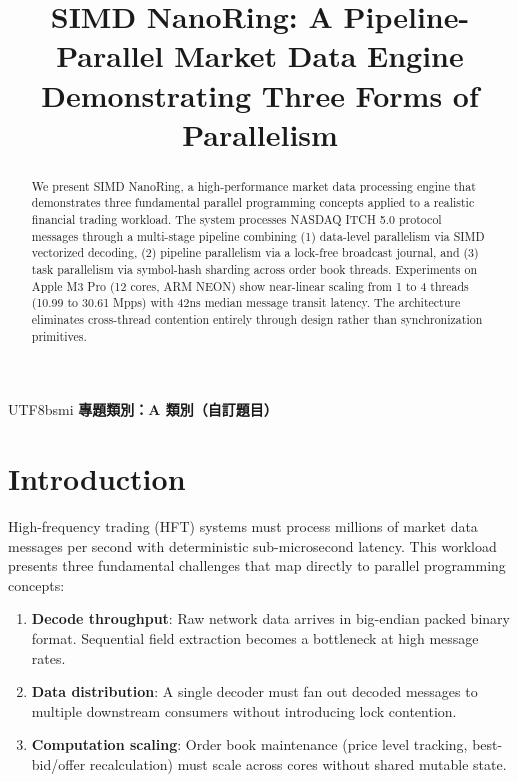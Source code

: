 \documentclass[conference]{IEEEtran}
\begin{document}
\title{SIMD NanoRing: A Pipeline-Parallel Market Data Engine\\Demonstrating Three Forms of Parallelism}

\author{
}

\maketitle

\begin{abstract}
We present SIMD NanoRing, a high-performance market data processing engine that demonstrates three fundamental parallel programming concepts applied to a realistic financial trading workload. The system processes NASDAQ ITCH 5.0 protocol messages through a multi-stage pipeline combining (1) data-level parallelism via SIMD vectorized decoding, (2) pipeline parallelism via a lock-free broadcast journal, and (3) task parallelism via symbol-hash sharding across order book threads. Experiments on Apple M3 Pro (12 cores, ARM NEON) show near-linear scaling from 1 to 4 threads (10.99 to 30.61 Mpps) with 42ns median message transit latency. The architecture eliminates cross-thread contention entirely through design rather than synchronization primitives.
\end{abstract}

\begin{CJK}{UTF8}{bsmi}
\noindent\textbf{專題類別：A 類別（自訂題目）}
\end{CJK}

\section{Introduction}

High-frequency trading (HFT) systems must process millions of market data messages per second with deterministic sub-microsecond latency. This workload presents three fundamental challenges that map directly to parallel programming concepts:

\begin{enumerate}
    \item \textbf{Decode throughput}: Raw network data arrives in big-endian packed binary format. Sequential field extraction becomes a bottleneck at high message rates.
    \item \textbf{Data distribution}: A single decoder must fan out decoded messages to multiple downstream consumers without introducing lock contention.
    \item \textbf{Computation scaling}: Order book maintenance (price level tracking, best-bid/offer recalculation) must scale across cores without shared mutable state.
\end{enumerate}
\end{document}
